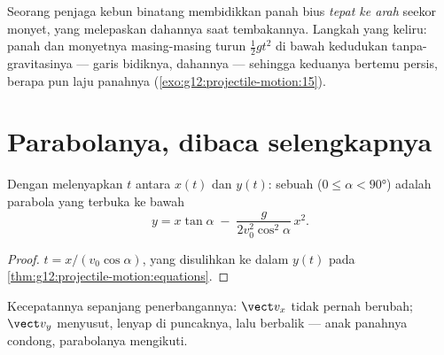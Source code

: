 \begin{remark}\label{rem:g12:projectile-motion:monkey}
Seorang penjaga kebun binatang membidikkan panah bius \emph{tepat ke arah}
seekor monyet, yang melepaskan dahannya saat tembakannya. Langkah yang
keliru: panah dan monyetnya masing-masing turun $\tfrac12 gt^2$ di bawah
kedudukan tanpa-gravitasinya --- garis bidiknya, dahannya --- sehingga
keduanya bertemu persis, berapa pun laju panahnya
(\cref{exo:g12:projectile-motion:15}).
\end{remark}

\section{Parabolanya, dibaca selengkapnya}

\begin{theorem}[Lintasannya]\label{thm:g12:projectile-motion:trajectory}
Dengan melenyapkan $t$ antara $x(t)$ dan $y(t)$:  sebuah 
($0 \leq \alpha < \ang{90}$) adalah parabola yang terbuka ke bawah
\[
y = x\tan\alpha \;-\; \frac{g}{2 v_0^2 \cos^2\alpha}\, x^2 .
\]
\end{theorem}

\begin{proof}
$t = x/(v_0\cos\alpha)$, yang disulihkan ke dalam $y(t)$ pada
\cref{thm:g12:projectile-motion:equations}.
\end{proof}

\begin{omfigure}

{\small Kecepatannya sepanjang penerbangannya: $\vect v_x$ tidak pernah berubah;
$\vect v_y$ menyusut, lenyap di puncaknya, lalu berbalik --- anak panahnya
condong, parabolanya mengikuti.}
\end{omfigure}

